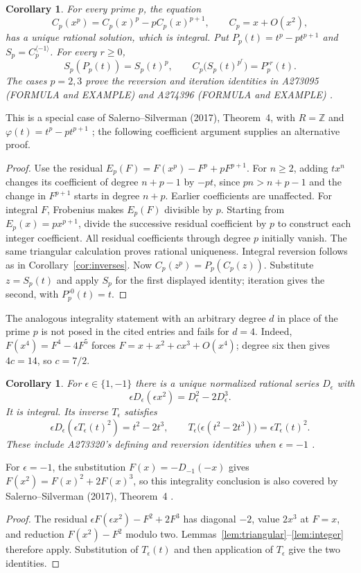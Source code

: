 \documentclass[11pt]{article}
\newtheorem{corollary}[theorem]{Corollary}
\newcommand{\Z}{\mathbb Z}
\begin{document}
\begin{corollary}\label{cor:prime}
For every prime $p$, the equation
\[
 C_p(x^p)=C_p(x)^p-pC_p(x)^{p+1},\qquad C_p=x+O(x^2),
\]
has a unique rational solution, which is integral.
Put $P_p(t)=t^p-pt^{p+1}$ and $S_p=C_p^{\langle-1\rangle}$.
For every $r\geq0$,
\[
 S_p(P_p(t))=S_p(t)^p,\qquad
 C_p\bigl(S_p(t)^{p^r}\bigr)=P_p^{\circ r}(t).
\]
The cases $p=2,3$ prove the reversion and iteration identities in
A273095 (FORMULA and EXAMPLE) and A274396 (FORMULA and EXAMPLE)
\cite{hanna095,hanna396}.
\end{corollary}
This is a special case of Salerno--Silverman (2017), Theorem~4,
with $R=\Z$ and $\varphi(t)=t^p-pt^{p+1}$ \cite{ss}; the following
coefficient argument supplies an alternative proof.
\begin{proof}
Use the residual $E_p(F)=F(x^p)-F^p+pF^{p+1}$.
For $n\geq2$, adding $t x^n$ changes its coefficient of degree $n+p-1$
by $-pt$, since $pn>n+p-1$ and the change in $F^{p+1}$ starts in degree
$n+p$. Earlier coefficients are unaffected. For integral $F$, Frobenius
makes $E_p(F)$ divisible by $p$. Starting from
$E_p(x)=px^{p+1}$, divide the successive residual coefficient by $p$
to construct each integer coefficient. All residual coefficients through
degree $p$ initially vanish. The same triangular calculation proves
rational uniqueness. Integral reversion follows as in
Corollary~\ref{cor:inverses}.
Now $C_p(z^p)=P_p(C_p(z))$. Substitute $z=S_p(t)$ and apply $S_p$
for the first displayed identity; iteration gives the second, with
$P_p^{\circ0}(t)=t$.
\end{proof}

The analogous integrality statement with an arbitrary degree $d$ in place
of the prime $p$ is not posed in the cited entries and fails for $d=4$.
Indeed, $F(x^4)=F^4-4F^5$ forces $F=x+x^2+cx^3+O(x^4)$;
degree six then gives $4c=14$, so $c=7/2$.

\begin{corollary}\label{cor:signed}
For $\epsilon\in\{1,-1\}$ there is a unique normalized rational series
$D_\epsilon$ with
\[
 \epsilon D_\epsilon(\epsilon x^2)=D_\epsilon^2-2D_\epsilon^3.
\]
It is integral. Its inverse $T_\epsilon$ satisfies
\[
 \epsilon D_\epsilon(\epsilon T_\epsilon(t)^2)=t^2-2t^3,
 \qquad
 T_\epsilon\bigl(\epsilon(t^2-2t^3)\bigr)
       =\epsilon T_\epsilon(t)^2.
\]
These include A273320's defining and reversion identities when
$\epsilon=-1$ \cite{hanna320}.
\end{corollary}
For $\epsilon=-1$, the substitution $F(x)=-D_{-1}(-x)$ gives
$F(x^2)=F(x)^2+2F(x)^3$, so this integrality conclusion is also
covered by Salerno--Silverman (2017), Theorem~4 \cite{ss}.
\begin{proof}
The residual $\epsilon F(\epsilon x^2)-F^2+2F^3$ has diagonal $-2$,
value $2x^3$ at $F=x$, and reduction $F(x^2)-F^2$ modulo two.
Lemmas~\ref{lem:triangular}--\ref{lem:integer} therefore apply.
Substitution of $T_\epsilon(t)$ and then application of $T_\epsilon$
give the two identities.
\end{proof}
\end{document}
